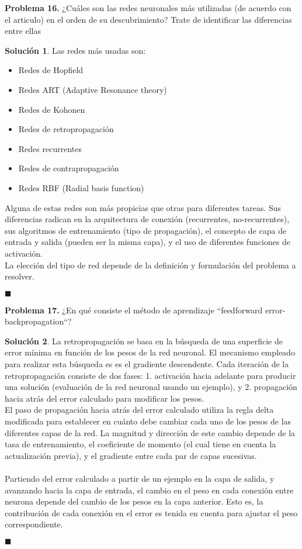 \documentclass[12pt]{article}
\theoremstyle{plain}
\theoremstyle{definition}
\theoremstyle{definition}
\theoremstyle{definition}
\newtheorem*{solution}{Solución}
\begin{document}
\noindent \textbf{Problema 16.}  ¿Cuáles son las redes neuronales  más utilizadas (de acuerdo con el articulo) en el orden de su descubrimiento? Trate de identificar las diferencias entre ellas

\begin{solution}
Las redes más usadas son:
\begin{itemize}
    \item Redes de Hopfield
    \item Redes ART (Adaptive Resonance theory)
    \item Redes de Kohonen
    \item Redes de retropropagación
    \item Redes recurrentes
    \item Redes de contrapropagación
    \item Redes RBF (Radial basis function)
\end{itemize}
Alguna de estas redes son más propicias que otras para diferentes tareas. Sus diferencias radican en la arquitectura de conexión (recurrentes, no-recurrentes), sus algoritmos de entrenamiento (tipo de propagación), el concepto de capa de entrada y salida (pueden ser la misma capa), y el uso de diferentes funciones de activación.\\
La elección del tipo de red depende de la definición y formulación del problema a resolver.
\end{solution}
\begin{flushright}
$\blacksquare$
\end{flushright}

\noindent \textbf{Problema 17.} ¿En qué consiste el método de aprendizaje “feedforward error-backpropagation“?
\begin{solution}
La retropropagación se basa en la búsqueda de una superficie de error mínima en función de los pesos de la red neuronal. El mecanismo empleado para realizar esta búsqueda es es el gradiente descendente. Cada iteración de la retropropagación consiste de dos fases: 1. activación hacia adelante para producir una solución (evaluación de la red neuronal usando un ejemplo), y 2. propagación hacia atrás del error calculado para modificar los pesos.\\
El paso de propagación hacia atrás del error calculado utiliza la regla delta modificada para establecer en cuánto debe cambiar cada uno de los pesos de las diferentes capas de la red. La magnitud y dirección de este cambio depende de la tasa de entrenamiento, el coeficiente de momento (el cual tiene en cuenta la actualización previa), y el gradiente entre cada par de capas sucesivas.\\
\\ Partiendo del error calculado a partir de un ejemplo en la capa de salida, y avanzando hacia la capa de entrada, el cambio en el peso en cada conexión entre neurona depende del cambio de los pesos en la capa anterior. Esto es, la contribución de cada conexión en el error es tenida en cuenta para ajustar el peso correspondiente.
\end{solution}
\begin{flushright}
$\blacksquare$
\end{flushright}
\end{document}
